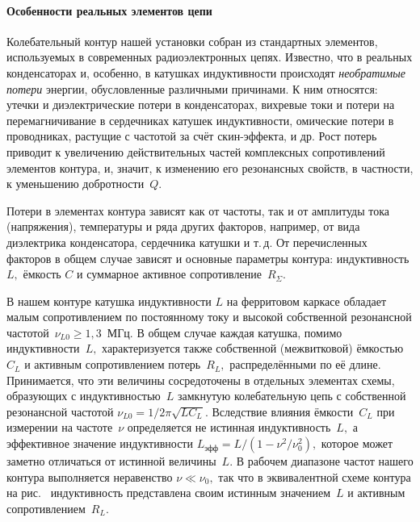 \paragraph{Особенности реальных элементов цепи}
\label{par:real_elements}

Колебательный контур нашей установки собран из стандартных элементов,
используемых в современных радиоэлектронных цепях. Известно, что в реальных
конденсаторах и, особенно, в катушках индуктивности происходят 
\emph{необратимые потери} энергии, обусловленные различными причинами. К ним относятся: утечки и
диэлектрические потери в конденсаторах, вихревые токи и потери на
перемагничивание в сердечниках катушек индуктивности, омические потери в
проводниках, растущие с частотой за счёт скин-эффекта, и др. Рост
потерь приводит к увеличению действительных частей комплексных сопротивлений
элементов контура, и, значит, к изменению его резонансных свойств, в частности,
к уменьшению добротности~$Q$.

Потери в элементах контура зависят как от частоты, так и от амплитуды тока
(напряжения), температуры и ряда других факторов, например, от вида диэлектрика
конденсатора, сердечника катушки и т.\,д. От перечисленных факторов в общем случае
зависят и основные параметры контура: индуктивность $L,$ ёмкость $C$ и суммарное
активное сопротивление~$R_{\Sigma}$.

В нашем контуре катушка индуктивности $L$ на ферритовом каркасе обладает малым
сопротивлением по постоянному току и высокой собственной резонансной
частотой~$\nu_{L0}\ge1,3$~МГц. В общем случае каждая катушка, помимо индуктивности~$L,$ характеризуется также собственной (межвитковой) ёмкостью $C_L$ и активным
сопротивлением потерь~$R_L,$ распределёнными по её длине. Принимается, что эти
величины сосредоточены в отдельных элементах схемы, образующих с индуктивностью~$L$ 
замкнутую колебательную цепь с собственной резонансной частотой
$\nu_{L0}=1/2\pi\sqrt{LC_L}.$ Вследствие влияния ёмкости~$C_L$ при измерении на
частоте~$\nu$ определяется не истинная индуктивность~$L,$ а эффективное значение
индуктивности $L_{эфф}=L/(1-\nu^2/\nu_0^2),$ которое может заметно отличаться от
истинной величины~$L.$ В рабочем диапазоне частот нашего контура выполняется
неравенство $\nu \ll \nu_0,$ так что в эквивалентной схеме контура на рис.~
индуктивность представлена своим истинным значением~$L$ и активным
сопротивлением~$R_L.$

